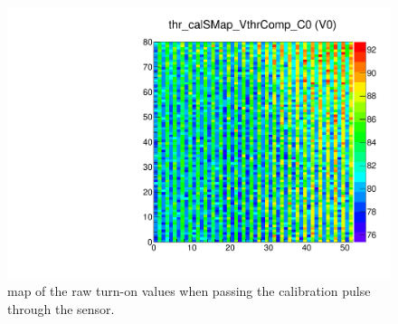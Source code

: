 \begin{figure}[!Hp]
\centering
\begin{minipage}{0.45\textwidth}
  \includegraphics[width=1.0\textwidth]{figures/bb3_thr_calSMap_VthrComp.pdf}
  \caption{\roc map of the raw \vthrcomp turn-on values when passing the calibration pulse through the sensor.}
  \label{fig:bb3_thr_calSMap_VthrComp}
\end{minipage}
\end{figure}


